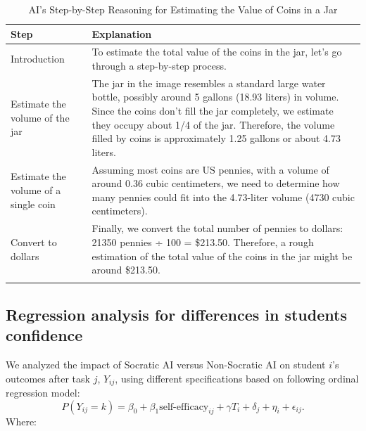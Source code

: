 \documentclass[
  12pt,
]{article}
\begin{document}
\begin{table}

\caption{\label{tab:explanation}AI's Step-by-Step Reasoning for Estimating the Value of Coins in a Jar}
\centering
\begin{tabular}[t]{l>{\raggedright\arraybackslash}p{4in}}
\toprule
Step & Explanation\\
\midrule\arrayrulecolor{gray!20}
Introduction & To estimate the total value of the coins in the jar, let's go through a step-by-step process.\\
Estimate the volume of the jar & The jar in the image resembles a standard large water bottle, possibly around 5 gallons (18.93 liters) in volume. Since the coins don't fill the jar completely, we estimate they occupy about 1/4 of the jar. Therefore, the volume filled by coins is approximately 1.25 gallons or about 4.73 liters.\\
Estimate the volume of a single coin & Assuming most coins are US pennies, with a volume of around 0.36 cubic centimeters, we need to determine how many pennies could fit into the 4.73-liter volume (4730 cubic centimeters).\\
Convert to dollars & Finally, we convert the total number of pennies to dollars: 21350 pennies ÷ 100 = \$213.50. Therefore, a rough estimation of the total value of the coins in the jar might be around \$213.50.\\
\arrayrulecolor{black}\bottomrule
\end{tabular}
\end{table}
\newpage

\subsection{Regression analysis for differences in students confidence}\label{sec:regress-confidence}

We analyzed the impact of Socratic AI versus Non-Socratic AI on student \(i\)'s outcomes after task \(j\), \(Y_{ij}\), using different specifications based on following ordinal regression model:
\[
  P(Y_{ij} = k) = 
    \beta_0 + \beta_1 \text{self-efficacy}_{ij} + \gamma T_{i} 
    + \delta_j + \eta_i + \epsilon_{ij}.
\]
Where:
\end{document}
